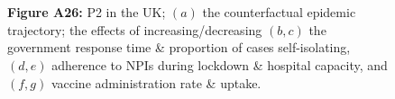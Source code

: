 \documentclass[paper=a4,fontsize=11pt]{article}
\begin{document}
\begin{figure}[!h]
  \\
  \hspace{1.76cm}
  \\
  \caption*{\textbf{Figure A26:} P2 in the UK; $(a)$ the counterfactual epidemic trajectory; the effects of increasing/decreasing $(b,c)$ the government response time \& proportion of cases self-isolating, $(d,e)$ adherence to NPIs during lockdown \& hospital capacity, and $(f,g)$ vaccine administration rate \& uptake.}
\end{figure}
\end{document}
